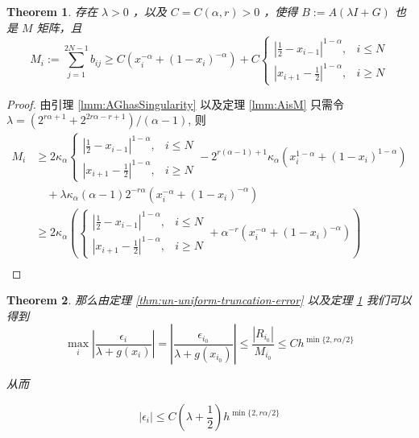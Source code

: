 \documentclass{ctexart}
\newtheorem{theorem}{Theorem}[section]
\theoremstyle{definition}
\theoremstyle{remark}
\numberwithin{equation}{section}
\begin{document}
\begin{theorem}\label{thm:ALGisM}
    存在 \(\lambda>0\) ，以及 \(C=C(\alpha,r) > 0\) ，使得 \(B := A(\lambda I+G)\) 也是 \(M\) 矩阵，且
    \begin{equation}
        M_i := \sum_{j=1}^{2N-1} b_{ij} \ge C(x_i^{-\alpha} + (1-x_i)^{-\alpha}) + C\begin{cases}
            |\frac{1}{2} - x_{i-1}|^{1-\alpha} , & i\le N \\
            |x_{i+1} - \frac{1}{2}|^{1-\alpha} , & i\ge N
        \end{cases}
    \end{equation}
\end{theorem}
\begin{proof}
    由引理 \ref{lmm:AGhasSingularity} 以及定理 \ref{lmm:AisM}  只需令 \(\lambda = (2^{r\alpha+1}+2^{2r\alpha-r+1})/(\alpha-1)\), 则
    \begin{equation}
        \begin{aligned}
            M_i & \ge 2\kappa_\alpha \begin{cases}
                              |\frac{1}{2} - x_{i-1}|^{1-\alpha} , & i\le N \\
                              |x_{i+1} - \frac{1}{2}|^{1-\alpha} , & i\ge N
                          \end{cases}
            - 2^{r(\alpha-1)+1} \kappa_\alpha (x_i^{1-\alpha} + (1-x_i)^{1-\alpha}) \\
            & \quad + \lambda \kappa_\alpha(\alpha-1) 2^{-r\alpha} (x_i^{-\alpha} + (1-x_i)^{-\alpha}) \\
                & \ge 2\kappa_\alpha \left(\begin{cases}
                              |\frac{1}{2} - x_{i-1}|^{1-\alpha} , & i\le N \\
                              |x_{i+1} - \frac{1}{2}|^{1-\alpha} , & i\ge N
                          \end{cases}  +   \alpha^{-r} (x_i^{-\alpha} + (1-x_i)^{-\alpha})\right) \\
        \end{aligned}
    \end{equation}
\end{proof}


\begin{theorem} \label{thm:un-uniform-convergence}
    那么由定理 \ref{thm:un-uniform-truncation-error} 以及定理 \ref{thm:ALGisM}  我们可以得到
    \begin{equation}
        \max_i |\frac{\epsilon_i}{\lambda+g(x_{i})}| = |\frac{\epsilon_{i_0}}{\lambda+g(x_{i_0})}| \le \frac{|R_{i_0}|}{M_{i_0}} \le C h^{\min\{2,r\alpha/2\}}
    \end{equation}


    从而

    \begin{equation}
        |\epsilon_i| \le C (\lambda+\frac{1}{2}) h^{\min\{2,r\alpha/2\}}
    \end{equation}
\end{theorem}
\end{document}
